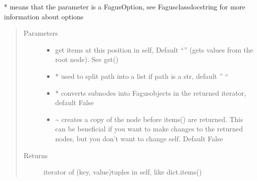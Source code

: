\documentclass[a4paper,10pt,english]{sphinxmanual}
\begin{document}
\begin{fulllineitems}
\begin{fulllineitems}
\sphinxAtStartPar
* means that the parameter is a FagusOption, see Fagus\sphinxhyphen{}class\sphinxhyphen{}docstring for more information about options
\begin{quote}\begin{description}
\item[{Parameters}] \leavevmode\begin{itemize}
\item {}
\sphinxAtStartPar
{} \textendash{} get items at this position in self, Default “” (gets values from the root node). See get()

\item {}
\sphinxAtStartPar
{} \textendash{} * used to split path into a list if path is a str, default ” “

\item {}
\sphinxAtStartPar
{} \textendash{} * converts sub\sphinxhyphen{}nodes into Fagus\sphinxhyphen{}objects in the returned iterator, default False

\item {}
\sphinxAtStartPar
{} \textendash{} \textasciitilde{} creates a copy of the node before items() are returned. This can be beneficial if you want to make
changes to the returned nodes, but you don’t want to change self. Default False

\end{itemize}

\item[{Returns}] \leavevmode
\sphinxAtStartPar
iterator of (key, value)\sphinxhyphen{}tuples in self, like dict.items()

\end{description}\end{quote}

\end{fulllineitems}



\end{fulllineitems}
\end{document}
